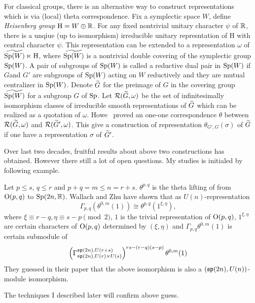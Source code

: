 \documentclass{amsart}
\begin{document}
For classical groups, there is an alternative way to construct
representations which is 
via (local) theta correspondence.  
Fix a symplectic space $W$, define
\emph{Heisenberg group} $\mathrm{H} = W\oplus \bR$. For any fixed nontrivial
unitary character $\psi$ of $\bR$, there is a unqiue (up to
isomorphism) irreducible unitary represntation of $\mathrm{H}$ with
central character $\psi$.  This representation can be extended to a
representation $\omega$ of $\widetilde{\Sp(W)}\ltimes \mathrm{H}$,
where $\widetilde{\Sp(W)}$ is a nontrivial double covering of the
symplectic group $\Sp(W)$.
A pair of subgroups of $\Sp(W)$ is called  a reductive dual pair in
$\Sp(W)$ if $G$and $G'$  are subgroups of $\Sp(W)$  acting on $W$ reductively
and they are mutual centralizer in $\Sp(W)$. 
Denote $\tG$ for the preimage of $G$ in the covering group
$\widetilde{\Sp(W)}$ for a subgroup $G$ of $\Sp$.  Let
$\sR(\tG,\omega)$ be the set of infinitesimally isomorphism classes of irreducible
smooth representations of $\tG$ which can be realized as a quotation
of $\omega$.  Howe~\cite{Howe1989Tran} proved an one-one correspondence
$\theta$ between $\sR(\tG,\omega)$ and $\sR(\tG',\omega)$.  This give
a construction of representation $\theta_{G',G}(\sigma)$ of $\tG$ if one have a representation $\sigma$
of $\tG'$. 

Over last two decades, fruitful results about above two constructions has obtained. However there still a lot of open questions.
My studies is initialed by following example.
\begin{eg}\label{eg:wz2004}
Let $p\leq s$, $q\leq r$ and
$p+q=m\leq n=r+s$. 
$\theta^{p,q}$ is the theta lifting of  from $\O(p,q)$ to $\Sp(2n,\bR)$.
Wallach and Zhu \cite{WallachZhu2004} have shown that as $U(n)$-representation
\[
\Gamma_{p,q}(\theta^{0,m}(1)) \cong \theta^{p,q}(1^{\xi,\eta}),
\]
where $\xi \equiv r-q, \eta\equiv s-p \pmod{2}$, $1$ is the trivial representation of $\O(p,q)$, $1^{\xi,\eta}$ are certain characters of $\O(p,q)$
determined by $(\xi, \eta)$ and
$\Gamma_{p,q}\theta^{0,m}(1)$ is certain submodule of 
\[
\left(\Gamma_{\sp(2n),U(r)\times U(s)}^{\sp(2n), U(r+s)}\right)^{rs-(r-q)(s-p)}\theta^{0,m}(1)
\]
They guessed in their paper that the above isomorphism is also a $(\sp(2n), U(n))$-module isomorphism.

The techniques  I described later will confirm above guess.
\end{eg}
\end{document}
